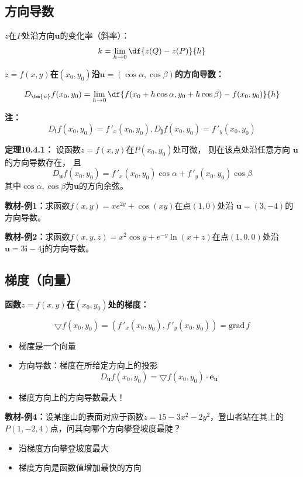 \subsection{方向导数}

$z$在$P$处沿方向$\bm{u}$的变化率（斜率）： 
$$k=\lim\limits_{h\to 0}\df{z(Q)-z(P)}{h}$$

{\bf $z=f(x,y)$在$(x_0,y_0)$沿$\bm{u}=(\cos\alpha,\cos\beta)$的方向导数：}

$${D_{\bm{u}}f(x_0,y_0)=\lim\limits_{h\to 0}
\df{f(x_0+h\cos\alpha,y_0+h\cos\beta)-f(x_0,y_0)}{h}}$$

{\bf 注：}$$D_{\bm{i}}f(x_0,y_0)=f\,'_x(x_0,y_0),
D_{\bm{j}}f(x_0,y_0)=f\,'_y(x_0,y_0)$$

{\bf 定理10.4.1：}
设函数$z=f(x,y)$在$P(x_0,y_0)$处可微， 则在该点处沿任意方向
$\bm{u}$的方向导数存在， 且
$$D_{\bm{u}}f(x_0,y_0) =f\,'_x(x_0,y_0)\cos\alpha+f\,'_y(x_0,y_0)\cos\beta$$
其中$\cos\alpha,\cos\beta$为$\bm{u}$的方向余弦。

{\bf 教材-例1：}求函数$f(x,y)=xe^{2y}+\cos(xy)$在点$(1,0)$处沿
$\bm{u}=(3,-4)$的方向导数。

{\bf 教材-例2：}求函数$f(x,y,z)=x^2\cos y+e^{-y}\ln(x+z)$在点$(1,0,0)$处沿
$\bm{u}=3\bm{i}-4\bm{j}$的方向导数。

\subsection{梯度（向量）}

{\bf 函数$z=f(x,y)$在$(x_0,y_0)$处的梯度：}

$$\bigtriangledown
f(x_0,y_0)=(f\,'_x(x_0,y_0),f\,'_y(x_0,y_0))=\bm{\mathrm{grad}}\,f$$

\begin{itemize}
  \item 梯度是一个向量
  \item 方向导数：梯度在所给定方向上的投影
  $${D_{\bm{u}}f(x_0,y_0)=\bigtriangledown f(x_0,y_0)\cdot\bm{e_u}}$$
  \item 梯度方向上的方向导数最大！
\end{itemize}

{\bf 教材-例4：}设某座山的表面对应于函数$z=15-3x^2-2y^2$，登山者站在其上的
$P(1,-2,4)$点，问其向哪个方向攀登坡度最陡？

\begin{itemize}
  \item 沿梯度方向攀登坡度最大 
  \item 梯度方向是函数值增加最快的方向 
\end{itemize}

